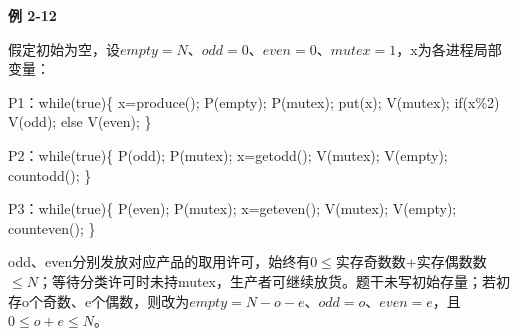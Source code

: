 {\color{ink}\bfseries 例 2-12}\par\vspace{1bp}假定初始为空，设\(empty=\allowbreak{}N\)、\(odd=\allowbreak{}0\)、\(even=\allowbreak{}0\)、\(mutex=\allowbreak{}1\)，x为各进程局部变量：\par P1：while(true)\{ x=\allowbreak{}produce();\allowbreak{} P(empty);\allowbreak{} P(mutex);\allowbreak{} put(x);\allowbreak{} V(mutex);\allowbreak{} if(x\%2) V(odd);\allowbreak{} else V(even);\allowbreak{} \}\par P2：while(true)\{ P(odd);\allowbreak{} P(mutex);\allowbreak{} x=\allowbreak{}getodd();\allowbreak{} V(mutex);\allowbreak{} V(empty);\allowbreak{} countodd();\allowbreak{} \}\par P3：while(true)\{ P(even);\allowbreak{} P(mutex);\allowbreak{} x=\allowbreak{}geteven();\allowbreak{} V(mutex);\allowbreak{} V(empty);\allowbreak{} counteven();\allowbreak{} \}\par odd、even分别发放对应产品的取用许可，始终有\(0\le \)实存奇数数+\allowbreak{}实存偶数数\(\le N\)；等待分类许可时未持mutex，生产者可继续放货。题干未写初始存量；若初存o个奇数、e个偶数，则改为\(empty=\allowbreak{}N-o-e\)、\(odd=\allowbreak{}o\)、\(even=\allowbreak{}e\)，且\(0\le o+\allowbreak{}e\le N\)。
